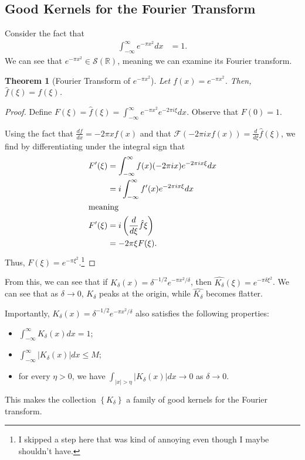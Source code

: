 \documentclass[10pt]{extarticle}
\newcommand{\R}{\mathbb{R}}
\newcommand{\set}[1]{\left\{#1\right\}}
\theoremstyle{plain}
\newtheorem*{theorem}{Theorem}%
\theoremstyle{definition}
\theoremstyle{remark}
\renewcommand{\newline}{\hfill\break}
\begin{document}
  \subsection{Good Kernels for the Fourier Transform}%
  Consider the fact that
  \begin{align*}
    \int_{-\infty}^{\infty}e^{-\pi x^2}dx &= 1.
  \end{align*}
  We can see that $e^{-\pi x^2}\in \mathcal{S}(\R)$, meaning we can examine its Fourier transform.
  \begin{theorem}[Fourier Transform of $e^{-\pi x^2}$]
    Let $f(x) = e^{-\pi x^2}$. Then, $\hat{f}(\xi) = f(\xi)$.
  \end{theorem}
  \begin{proof}
    Define $F(\xi) = \hat{f}(\xi) = \int_{-\infty}^{\infty}e^{-\pi x^2}e^{-2\pi i \xi}dx$. Observe that $F(0) = 1$.\newline

    Using the fact that $\frac{df}{dx} = -2\pi x f(x)$ and that $\mathcal{F}\left(-2\pi i x f(x)\right) = \frac{d}{d\xi}\hat{f}(\xi)$, we find by differentiating under the integral sign that
    \begin{align*}
      F'(\xi) &= \int_{-\infty}^{\infty}f(x)(-2\pi i x)e^{-2\pi i x \xi}dx\\
              &= i\int_{-\infty}^{\infty}f'(x)e^{-2\pi i x \xi}dx\\
              \intertext{meaning}
      F'(\xi) &= i\left(\frac{d}{d\xi}\hat{f}\xi\right)\\
              &= -2\pi \xi F(\xi).
    \end{align*}
    Thus, $F(\xi) = e^{-\pi \xi^2}$.\footnote{I skipped a step here that was kind of annoying even though I maybe shouldn't have.}
  \end{proof}
  From this, we can see that if $K_{\delta}(x) = \delta^{-1/2}e^{-\pi x^2/\delta}$, then $\widehat{K_{\delta}}(\xi) = e^{-\pi \delta \xi^2}$. We can see that as $\delta \rightarrow 0$, $K_{\delta}$ peaks at the origin, while $\widehat{K_{\delta}}$ becomes flatter.\newline

  Importantly, $K_{\delta}(x) = \delta^{-1/2}e^{-\pi x^2/\delta}$ also satisfies the following properties:
  \begin{itemize}
    \item $\displaystyle \int_{-\infty}^{\infty}K_{\delta}(x)dx = 1$;
    \item $\displaystyle \int_{-\infty}^{\infty}\left\vert K_{\delta}(x)\right\vert dx \leq M$;
    \item for every $\eta > 0$, we have $\displaystyle\int_{|x| > \eta}\left\vert K_{\delta}(x)\right\vert dx \rightarrow 0$ as $\delta \rightarrow 0$.
  \end{itemize}
  This makes the collection $\set{K_{\delta}}$ a family of good kernels for the Fourier transform.\newline
\end{document}
